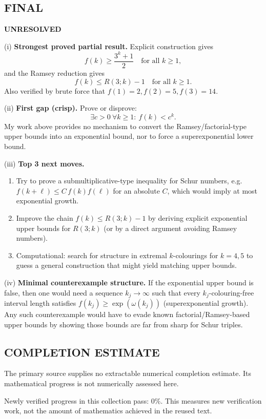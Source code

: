\subsection*{FINAL}
\textbf{UNRESOLVED}

(i) \textbf{Strongest proved partial result.} Explicit construction gives
\[f(k)\ge \frac{3^k+1}{2}\quad\text{for all }k\ge 1,\]
and the Ramsey reduction gives
\[f(k)\le R(3;k)-1\quad\text{for all }k\ge 1.\]
Also verified by brute force that $f(1)=2,f(2)=5,f(3)=14$.

(ii) \textbf{First gap (crisp).} Prove or disprove:
\[\exists c>0\ \forall k\ge 1:\ f(k) < c^k.\]
My work above provides no mechanism to convert the Ramsey/factorial-type upper bounds into an exponential bound, nor to force a superexponential lower bound.

(iii) \textbf{Top 3 next moves.}
\begin{enumerate}
\item Try to prove a submultiplicative-type inequality for Schur numbers, e.g. $f(k+\ell)\le C\,f(k)f(\ell)$ for an absolute $C$, which would imply at most exponential growth.
\item Improve the chain $f(k)\le R(3;k)-1$ by deriving explicit exponential upper bounds for $R(3;k)$ (or by a direct argument avoiding Ramsey numbers).
\item Computational: search for structure in extremal $k$-colourings for $k=4,5$ to guess a general construction that might yield matching upper bounds.
\end{enumerate}

(iv) \textbf{Minimal counterexample structure.} If the exponential upper bound is false, then one would need a sequence $k_j\to\infty$ such that every $k_j$-colouring-free interval length satisfies $f(k_j)\ge \exp(\omega(k_j))$ (superexponential growth). Any such counterexample would have to evade known factorial/Ramsey-based upper bounds by showing those bounds are far from sharp for Schur triples.

\bigskip



\subsection*{COMPLETION ESTIMATE}
The primary source supplies no extractable numerical completion estimate. Its mathematical progress is not numerically assessed here.

Newly verified progress in this collection pass: $0\%$. This measures new verification work, not the amount of mathematics achieved in the reused text.
